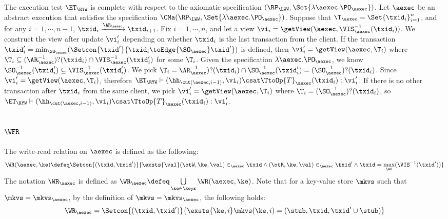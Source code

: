 The execution test $\ET_{\RYW}$ is complete with respect to 
the axiomatic specification $(\RP_{\LWW}, \Set{\lambda \aexec.\PO_{\aexec} })$. 
Let $\aexec$ be an abstract execution that satisfies the specification
$\CMa(\RP_{\LWW}, \Set{\lambda \aexec.\PO_{\aexec} })$.
Suppose that $\T_{\aexec} = \Set{\txid_{i}}_{i=1}^{n}$, and for any $i=1,\cdots, n-1$,
$\txid_{i} \xrightarrow{\AR_{\aexec}} \txid_{i+1}$.
Fix $i=1,\cdots,n$, and let a view $\vi_{i} = \getView(\aexec, \VIS^{-1}_{\aexec}(\txid_{i}))$.
We construct the view after update \( \vi'_i\) depending on whether \( \txid_i \) is the last transaction from the client.
If the transaction \( \txid'_i = \min_{\SO_\aexec}(\Setcon{\txid'}{\txid_i \toEdge{\SO_\aexec} \txid' } ) \)  is defined,
then \( \vi'_i = \getView(\aexec, \T_i) \) where \( \T_i \subseteq (\AR_{\aexec}^{-1})?(\txid_i) \cap \VIS_\aexec^{-1}(\txid'_i) \) for some \( \T_i \).
Given the specification \( \lambda \aexec.\PO_{\aexec} \), 
we know \( \SO_\aexec^{-1}(\txid'_i) \subseteq \VIS_\aexec^{-1}(\txid'_i) \).
We pick \( \T_i = \AR_\aexec^{-1})?(\txid_i) \cap \SO_\aexec^{-1}(\txid'_i) = (\SO_\aexec^{-1})?(\txid_i) \).
Since \( \vi'_i = \getView(\aexec, \T_i) \), therefore \( \ET_\RYW \vdash (\hh_{\cut(\aexec, i-1)}, \vi_i) \csat \TtoOp{T}_{\aexec}(\txid_{i}) : \vi'_{i} \).
If there is no other transaction after \( \txid_i \) from the same client,
we pick \( \vi'_i = \getView(\aexec, \T_i) \) where \( \T_i = (\SO_\aexec^{-1})?(\txid_i) \),
so \( \ET_\RYW \vdash (\hh_{\cut(\aexec, i-1)}, \vi_i) \csat \TtoOp{T}_{\aexec}(\txid_{i}) : \vi'_{i} \).

\subsection{ \( \WFR \) }

\label{sec:sound-complete-wfr}

The write-read relation  on \( \aexec \) is defined as the following:
\[
\WR(\aexec, \ke) \defeq \Setcon{ (\txid, \txid') }{ \exsts{\val} (\otW, \ke, \val) \in_\aexec \txid \land (\otR, \ke, \val) \in_\aexec \txid' \land \txid = \max_\AR(\VIS^{-1}(\txid')) }
\]
The notation \( \WR_\aexec \) is defined as \( \WR_\aexec \defeq \bigcup\limits_{\ke \in \Keys} \WR(\aexec, \ke) \).
Note that for a key-value store \( \mkvs \) such that \( \mkvs = \mkvs_\aexec \),
by the definition of  \(  \mkvs = \mkvs_\aexec \), 
the following holds:
\[
    \WR_\aexec = \Setcon{(\txid, \txid')}{\exsts{\ke, i } \mkvs(\ke, i) = (\stub, \txid, \txid'\cup \stub)}
\]

